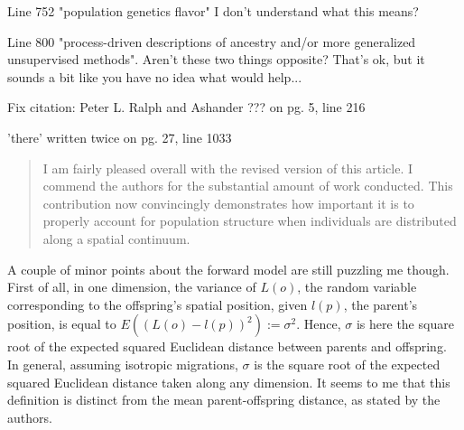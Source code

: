 \reply{
}

\begin{point}{Line 752 "population genetics flavor"}
I don't understand what this means?
\end{point}

\reply{
}

\begin{point}{Line 800}
"process-driven descriptions of ancestry and/or more generalized unsupervised methods". Aren't these two things opposite? That's ok, but it sounds a bit like you have no idea what would help...
\end{point}

\reply{
}


\begin{point}{}
 Fix citation: Peter L. Ralph and Ashander ??? on pg. 5, line 216
\end{point}

\reply{
}

\begin{point}{}
'there' written twice on pg. 27, line 1033
\end{point}

\reply{
}






\begin{quote}
I am fairly pleased overall with the revised version of this article. I commend the authors for the substantial amount of work conducted. This contribution now convincingly demonstrates how important it is to properly account for population structure when individuals are distributed along a spatial continuum.
\end{quote}

\begin{point}{}
A couple of minor points about the forward model are still puzzling me though. First of all, in one dimension, the variance of $L(o)$, the random variable corresponding to the offspring's spatial position, given $l(p)$, the parent's position, is equal to $E((L(o)-l(p))^2):=\sigma^2$. Hence, $\sigma$ is here the square root of the expected squared Euclidean distance between parents and offspring. In general, assuming isotropic migrations, $\sigma$ is the square root of the expected squared Euclidean distance taken along any dimension. It seems to me that this definition is distinct from the mean parent-offspring distance, as stated by the authors.
\end{point}

